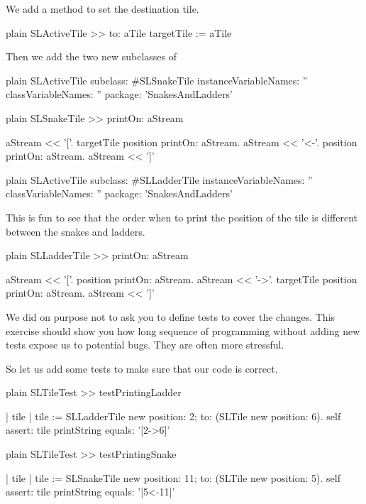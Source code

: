 \documentclass[10pt,twoside,english]{_support/latex/sbabook/sbabook}
\begin{document}
We add a method  to set the destination tile.

\begin{displaycode}{plain}
SLActiveTile >> to: aTile
	targetTile := aTile
\end{displaycode}

Then we add the two new subclasses of 

\begin{displaycode}{plain}
SLActiveTile subclass: #SLSnakeTile
	instanceVariableNames: ''
	classVariableNames: ''
	package: 'SnakesAndLadders'
\end{displaycode}

\begin{displaycode}{plain}
SLSnakeTile >> printOn: aStream

	aStream << '['.
	targetTile position printOn: aStream. 
	aStream << '<-'.
	position printOn: aStream.
	aStream << ']'
\end{displaycode}

\begin{displaycode}{plain}
SLActiveTile subclass: #SLLadderTile
	instanceVariableNames: ''
	classVariableNames: ''
	package: 'SnakesAndLadders'
\end{displaycode}

This is fun to see that the order when to print the position of the tile is different between the snakes and ladders.

\begin{displaycode}{plain}
SLLadderTile >> printOn: aStream

	aStream << '['.
	position printOn: aStream.
	aStream << '->'.
	targetTile position printOn: aStream.
	aStream << ']'
\end{displaycode}

We did on purpose not to ask you to define tests to cover the changes. This exercise should show you how long sequence of programming without adding new tests expose us to 
potential bugs. They are often more stressful.

So let us add some tests to make sure that our code is correct.

\begin{displaycode}{plain}
SLTileTest >> testPrintingLadder

	| tile |
	tile := SLLadderTile new position: 2; to: (SLTile new position: 6). 
	self assert: tile printString equals: '[2->6]'
\end{displaycode}

\begin{displaycode}{plain}
SLTileTest >> testPrintingSnake

	| tile |
	tile := SLSnakeTile new position: 11; to: (SLTile new position: 5). 
	self assert: tile printString equals: '[5<-11]'
\end{displaycode}
\end{document}
